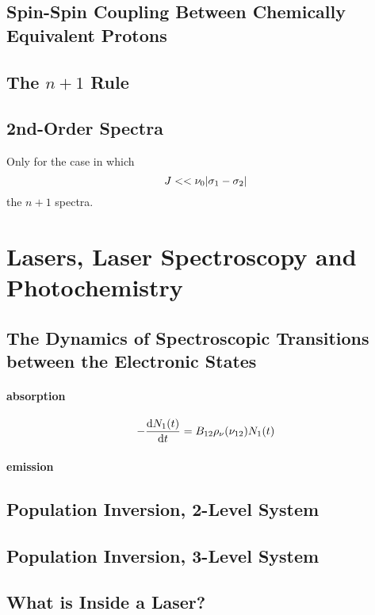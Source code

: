 \documentclass[a4paper]{article}
\numberwithin{equation}{section}
\begin{document}
\subsection{Spin-Spin Coupling Between Chemically Equivalent Protons}

\subsection{The $ n+1 $ Rule}

\subsection{2nd-Order Spectra}
Only for the case in which 
\begin{equation}\label{key}
J << \nu_0\abs{\sigma_1 - \sigma_2}
\end{equation}
the $ n+1 $ spectra.

\section{Lasers, Laser Spectroscopy and Photochemistry}
\subsection{}
\subsection{The Dynamics of Spectroscopic Transitions between the Electronic States}
\paragraph{absorption}
\begin{equation}\label{key}
-\dv{N_1(t)}{t} = B_{12}\rho_\nu(\nu_{12})N_1(t)
\end{equation}
\paragraph{emission}

\subsection{Population Inversion, 2-Level System}
\subsection{Population Inversion, 3-Level System}
\subsection{What is Inside a Laser?}
\end{document}
